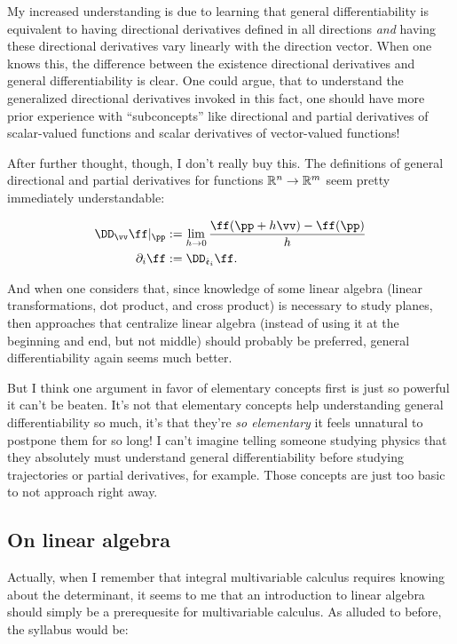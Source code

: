 My increased understanding is due to learning that general differentiability is equivalent to having directional derivatives defined in all directions \textit{and} having these directional derivatives vary linearly with the direction vector. When one knows this, the difference between the existence directional derivatives and general differentiability is clear. One could argue, that to understand the generalized directional derivatives invoked in this fact, one should have more prior experience with ``subconcepts'' like directional and partial derivatives of scalar-valued functions and scalar derivatives of vector-valued functions!

After further thought, though, I don't really buy this. The definitions of general directional and partial derivatives for functions $\mathbb{R}^n \rightarrow \mathbb{R}^m$ seem pretty immediately understandable:

\begin{align*}
    \DD_\vv \ff|_\pp &:= \lim_{h \rightarrow 0} \frac{\ff(\pp + h\vv) - \ff(\pp)}{h} \\
    \pd_i \ff &:= \DD_{\see_i} \ff.
\end{align*}

And when one considers that, since knowledge of some linear algebra (linear transformations, dot product, and cross product) is necessary to study planes, then approaches that centralize linear algebra (instead of using it at the beginning and end, but not middle) should probably be preferred, general differentiability again seems much better.

But I think one argument in favor of elementary concepts first is just so powerful it can't be beaten. It's not that elementary concepts help understanding general differentiability so much, it's that they're \textit{so elementary} it feels unnatural to postpone them for so long! I can't imagine telling someone studying physics that they absolutely must understand general differentiability before studying trajectories or partial derivatives, for example. Those concepts are just too basic to not approach right away.

\subsection*{On linear algebra}

Actually, when I remember that integral multivariable calculus requires knowing about the determinant, it seems to me that an introduction to linear algebra should simply be a prerequesite for multivariable calculus. As alluded to before, the syllabus would be:

